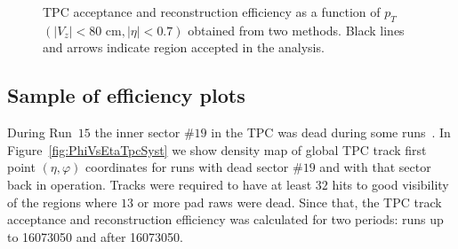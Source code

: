 \begin{figure}[ht]
{	}%
	\caption[TPC acceptance and reconstruction efficiency as a function of $p_T$ $\left(|V_z|<80\textrm{ cm}, |\eta|<0.7\right)$ obtained from two methods.]{TPC acceptance and reconstruction efficiency as a function of $p_T$ $\left(|V_z|<80\textrm{ cm}, |\eta|<0.7\right)$ obtained from two methods. Black lines and arrows indicate region accepted in the analysis.}\label{fig:trackTPCefficiencyComparisonEtaPhi}
\end{figure}


\subsection{Sample of  efficiency plots}\label{subsec:sampleTpcEffPlots}

During Run~$15$ the inner sector $\#19$ in the TPC was dead during some runs~\cite{sector19inner}. In Figure~\ref{fig:PhiVsEtaTpcSyst} we show density map of global TPC track first point $(\eta,\varphi)$ coordinates for runs with dead sector $\#19$  and with that sector back in operation. Tracks were required to have at least $32$ hits to good visibility of the regions where $13$ or more pad raws were dead.
Since that, the TPC track acceptance and reconstruction efficiency was calculated for two periods: runs up to 16073050 and after 16073050.

